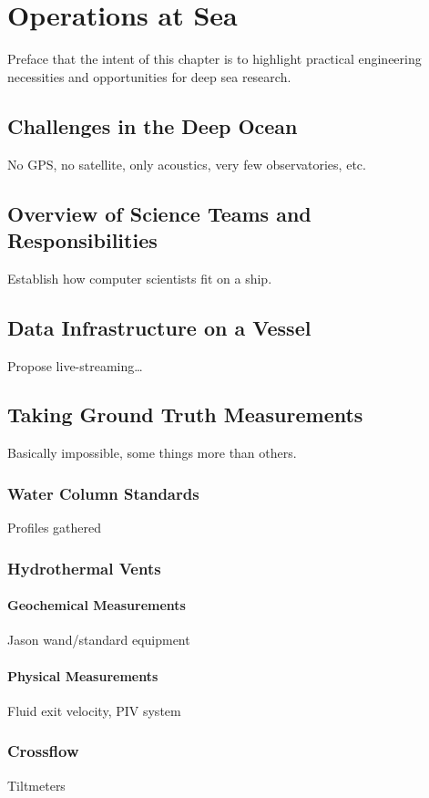 \chapter{Operations at Sea}
Preface that the intent of this chapter is to highlight practical engineering necessities and opportunities for deep sea research.

\section{Challenges in the Deep Ocean}
No GPS, no satellite, only acoustics, very few observatories, etc.

\section{Overview of Science Teams and Responsibilities}
Establish how computer scientists fit on a ship.

\section{Data Infrastructure on a Vessel}
Propose live-streaming\dots

\section{Taking Ground Truth Measurements}
Basically impossible, some things more than others.

\subsection{Water Column Standards}
Profiles gathered

\subsection{Hydrothermal Vents}

\subsubsection{Geochemical Measurements}
Jason wand/standard equipment

\subsubsection{Physical Measurements}
Fluid exit velocity, PIV system

\subsection{Crossflow}
Tiltmeters
